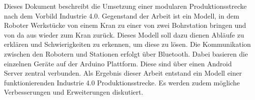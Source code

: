 
Dieses Dokument beschreibt die Umsetzung einer modularen Produktionsstrecke nach dem Vorbild Industrie 4.0.
Gegenstand der Arbeit ist ein Modell, in dem Roboter Werkstücke
von einem Kran zu einer von zwei Bohrstation bringen und von da aus wieder zum Kran zurück. Dieses Modell soll dazu dienen Abläufe zu erklären und Schwierigkeiten zu erkennen, um diese zu lösen.
Die Kommunikation zwischen den Robotern und Stationen erfolgt über Bluetooth. Dabei basieren die einzelnen Geräte auf der Arduino Plattform. Diese sind über einen Android Server zentral verbunden.
Als Ergebnis dieser Arbeit entstand ein Modell einer funktionierenden Industrie 4.0 Produktionsstrecke. Es werden zudem mögliche Verbesserungen und Erweiterungen diskutiert.
